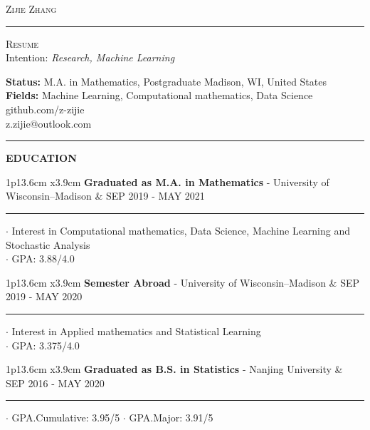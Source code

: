 \documentclass[11pt,A4]{article}
\newcommand{\cvsection}[1]
{
	\begin{center}
		\large\textcolor{sectcol}{\textbf{#1}}
	\end{center}
}
\newcommand{\metasection}[2]
{
\footnotesize{#2} \hspace*{\fill} \footnotesize{#1}\\[1pt]
}
\newcommand{\cvevent}[3]
{

\begin{tabular*}{1\textwidth}{p{13.6cm}  x{3.9cm}}
	\textbf{#2} - \textcolor{bgcol}{#3} &   \vspace{2.5pt}\textcolor{sectcol}{#1}
\end{tabular*}

\vspace{-8pt}
\textcolor{softcol}{\hrule}
\vspace{6pt}


}
\begin{document}
\pagestyle{fancy}

\vspace{-8pt}
\begin{center}
    \HUGE   \textsc{Zijie Zhang}
            \textcolor{sectcol}{\rule[-1mm]{1mm}{0.9cm}}
            \textsc{Resume}\\[2pt]
	\small  Intention: \textit{Research, Machine Learning}
\end{center}

\vspace{6pt}

\metasection{Madison, WI, United States}{\textbf{Status:} M.A. in Mathematics, Postgraduate}
\metasection{github.com/z-zijie}{\textbf{Fields:} Machine Learning, Computational mathematics, Data Science} 
\metasection{z.zijie@outlook.com}{}

\vspace{-2pt}
\textcolor{softcol}{\hrule}
\vspace{6pt}

\normalsize




\cvsection{EDUCATION}

\cvevent{SEP 2019 - MAY 2021}
        {Graduated as M.A. in Mathematics}
        {University of Wisconsin–Madison}

        $\cdot$ Interest in Computational mathematics, Data Science, Machine Learning and Stochastic Analysis\\
        $\cdot$ GPA: 3.88/4.0 \\

\cvevent{SEP 2019 - MAY 2020}
        {Semester Abroad}
        {University of Wisconsin–Madison}
        $\cdot$ Interest in Applied mathematics and Statistical Learning\\
        $\cdot$ GPA: 3.375/4.0 \\

\cvevent{SEP 2016 - MAY 2020}
        {Graduated as B.S. in Statistics}
        {Nanjing University}

        $\cdot$ GPA.Cumulative: 3.95/5
        $\cdot$ GPA.Major: 3.91/5\\
\end{document}

